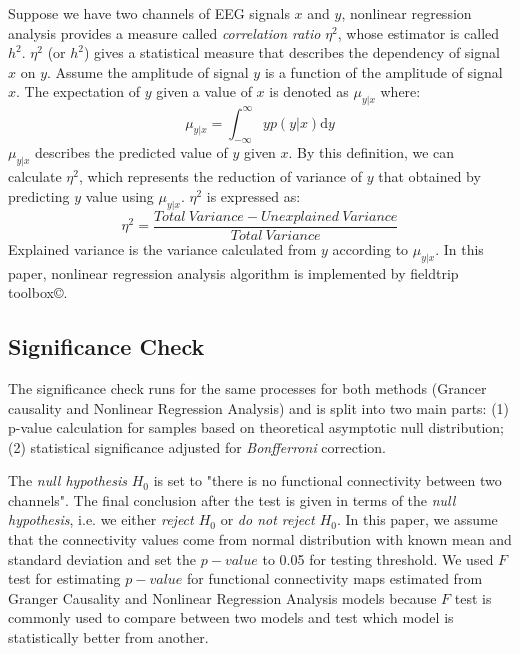 \documentclass[conference]{IEEEtran}
\begin{document}
Suppose we have two channels of EEG signals $x$ and $y$, nonlinear regression analysis provides a measure called \emph{correlation ratio} $\eta^2$, whose estimator is called $h^2$. $\eta^2$ (or $h^2$) gives a statistical measure that describes the dependency of signal $x$ on $y$. Assume the amplitude of signal $y$ is a function of the amplitude of signal $x$. The expectation of $y$ given a value of $x$ is denoted as $\mu_{y|x}$ where:
\begin{equation} \label{eq:regressioncurve}
\mu_{y|x} = \int_{-\infty}^{\infty} y p(y|x) \mathrm{d}y
\end{equation}
$\mu_{y|x}$ describes the predicted value of $y$ given $x$. By this definition, we can calculate $\eta^2$, which represents the reduction of variance of $y$ that obtained by predicting $y$ value using $\mu_{y|x}$. $\eta^2$ is expressed as:
\begin{equation} \label{eq:NRAregression}
\eta^2 = \frac{Total \ Variance - Unexplained \ Variance}{Total \ Variance}
\end{equation}
Explained variance is the variance calculated from $y$ according to $\mu_{y|x}$. In this paper, nonlinear regression analysis algorithm is implemented by fieldtrip toolbox\copyright.

\subsection{Significance Check}
The significance check runs for the same processes for both methods (Grancer causality and Nonlinear Regression Analysis) and is split into two main parts: (1) p-value calculation for samples based on theoretical asymptotic null distribution; (2) statistical significance adjusted for \emph{Bonfferroni} correction.

The \emph{null hypothesis} $H_0$ is set to "there is no functional connectivity between two channels". The final conclusion after the test is given in terms of the \emph{null hypothesis}, i.e. we either \emph{reject $H_0$} or \emph{do not reject $H_0$}. In this paper, we assume that the connectivity values come from normal distribution with known mean and standard deviation and set the $p-value$ to 0.05 for testing threshold. We used $F$ test for estimating $p-value$ for functional connectivity maps estimated from Granger Causality and Nonlinear Regression Analysis models because $F$ test is commonly used to compare between two models and test which model is statistically better from another.
\end{document}
